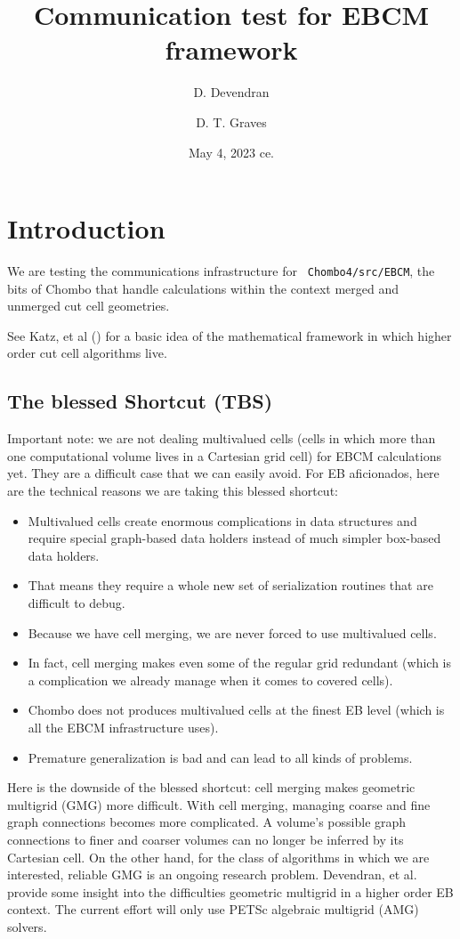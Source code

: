 \documentclass{article}
\begin{document}
\title{Communication test for EBCM framework}
\author{
    D. Devendran   \footnotemark[2] \and
    D. T. Graves    \footnotemark[1]
        }
\date{May 4, 2023 ce.}
\maketitle

\section{Introduction}

We are testing the communications infrastructure for {\tt
Chombo4/src/EBCM}, the bits of Chombo that handle calculations
within the context merged and
unmerged cut cell geometries.   

See Katz, et al (\cite{Katz2023}) for a basic idea of the mathematical
framework in which higher order cut cell algorithms live.

\subsection{The blessed Shortcut (TBS)}

Important note: we are not dealing multivalued cells (cells in which
more than one computational volume lives in a Cartesian grid cell) for
EBCM calculations yet.  They are a difficult case that we can easily
avoid.  For EB aficionados, here are the technical reasons we are
taking this blessed shortcut:
\begin{itemize}
  \item Multivalued cells create enormous complications in data
    structures and require special graph-based data holders instead of
    much simpler box-based data holders.
 \item That means they require a whole new set of serialization
   routines that are difficult to debug.   
 \item Because we have cell merging, we are never forced to use
   multivalued cells.
 \item In fact, cell merging makes even some of the
   regular grid redundant (which is a complication we already manage
   when it comes to covered cells).
 \item Chombo does not produces multivalued cells at the finest EB
   level (which is all the EBCM infrastructure uses).
 \item Premature generalization is bad and can lead to all kinds of
   problems.   
\end{itemize}
Here is the downside of the blessed shortcut: cell merging makes
geometric multigrid (GMG) more difficult.  With cell merging, managing
coarse and fine graph connections becomes more complicated. A volume's
possible graph connections to finer and coarser volumes can no longer
be inferred by its Cartesian cell. On the other hand, for the class of
algorithms in which we are interested, reliable GMG is an ongoing
research problem.  Devendran, et al. \cite{Devendran2014}
provide some insight into the difficulties geometric multigrid in a
higher order EB context.  The current effort will only use PETSc
\cite{petsc-user-ref, petsc-efficient} algebraic multigrid (AMG)
solvers.
\end{document}
